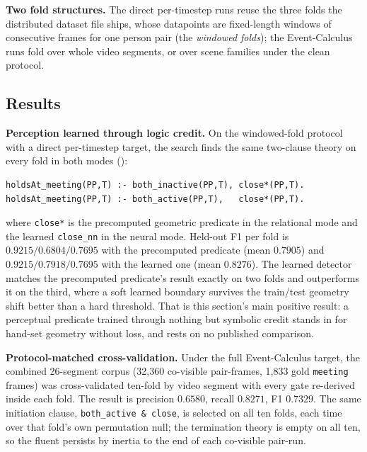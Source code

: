 \textbf{Two fold structures.} The direct per-timestep runs reuse the three folds the distributed dataset file ships, whose datapoints are fixed-length windows of consecutive frames for one person pair (the \emph{windowed folds}); the Event-Calculus runs fold over whole video segments, or over scene families under the clean protocol.

\subsection{Results}

\textbf{Perception learned through logic credit.} On the windowed-fold protocol with a direct per-timestep target, the search finds the same two-clause theory on every fold in both modes ():

\begin{lstlisting}[style=xlogstyle, basicstyle=\ttfamily\scriptsize,
                   caption={The two-clause theory the search returns on every
                            fold, in both the relational and the neural mode.},
                   label={lst:ec-theory}]
holdsAt_meeting(PP,T) :- both_inactive(PP,T), close*(PP,T).
holdsAt_meeting(PP,T) :- both_active(PP,T),   close*(PP,T).
\end{lstlisting}

\noindent where \texttt{close*} is the precomputed geometric predicate in the relational mode and the learned \texttt{close\_nn} in the neural mode. Held-out F1 per fold is $0.9215 / 0.6804 / 0.7695$ with the precomputed predicate (mean $0.7905$) and $0.9215 / 0.7918 / 0.7695$ with the learned one (mean $0.8276$). The learned detector matches the precomputed predicate's result exactly on two folds and outperforms it on the third, where a soft learned boundary survives the train/test geometry shift better than a hard threshold. That is this section's main positive result: a perceptual predicate trained through nothing but symbolic credit stands in for hand-set geometry without loss, and rests on no published comparison.

\textbf{Protocol-matched cross-validation.} Under the full Event-Calculus target, the combined 26-segment corpus (32{,}360 co-visible pair-frames, 1{,}833 gold \texttt{meeting} frames) was cross-validated ten-fold by video segment with every gate re-derived inside each fold. The result is precision $0.6580$, recall $0.8271$, F1 $0.7329$. The same initiation clause, \texttt{both\_active \& close}, is selected on all ten folds, each time over that fold's own permutation null; the termination theory is empty on all ten, so the fluent persists by inertia to the end of each co-visible pair-run.

